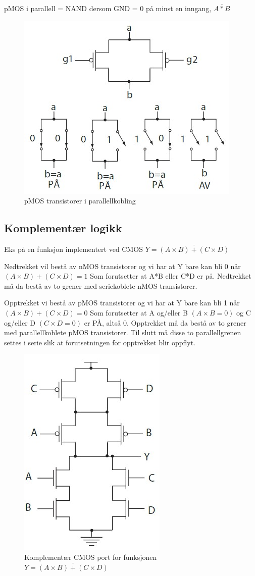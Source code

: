\documentclass{article}
\begin{document}
	pMOS i parallell = NAND dersom GND = 0 på minst en inngang, $\overline{A*B}$
	
	\begin{figure}[H]
		\includegraphics[scale = 0.6]{pMOSpara.jpg}
		\caption{pMOS transistorer i parallellkobling}
	\end{figure}
	
	\subsection{Komplementær logikk}
	
	Eks på en funksjon implementert ved CMOS
	$Y = \overline{(A \times B) + (C \times D)}$
	
	Nedtrekket vil bestå av nMOS transistorer og vi har at Y bare kan bli 0 når $(A \times B) + (C \times D) = 1$ Som forutsetter at A*B eller C*D er på. Nedtrekket må da bestå av to grener med seriekoblete nMOS transistorer.
	
	Opptrekket vi bestå av pMOS transistorer og vi har at Y bare kan bli 1 når $(A \times B) + (C \times D) = 0$ Som forutsetter at A og/eller B $(A \times B = 0)$ og C og/eller D $(C \times D = 0)$ er PÅ, altså 0. Opptrekket må da bestå av to grener med	parallellkoblete pMOS transistorer. Til slutt må disse to parallellgrenen settes i serie slik at forutsetningen for opptrekket blir oppflyt.
	
	\begin{figure}[H]
		\includegraphics[scale = 0.6]{CMOSeks.jpg}
		\caption{Komplementær CMOS port for funksjonen $Y = \overline{(A \times B)+(C \times D)}$}
	\end{figure}
	
	
	
\end{document}
